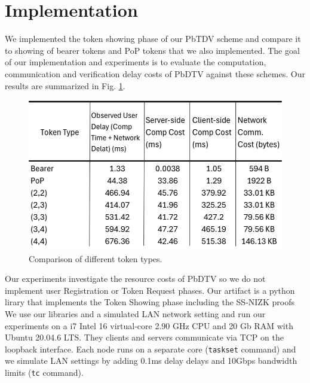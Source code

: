 \documentclass[conference]{IEEEtran}
\begin{document}
\section{Implementation}
\label{sec:Implementation}
We implemented the token showing phase of our PbTDV scheme and compare it to showing of bearer tokens and PoP tokens that we also implemented.
The goal of our implementation and experiments is to evaluate the computation, communication and verification delay costs of PbDTV against these schemes. Our results are summarized in Fig. \ref{experiment-table}.

\begin{figure}
\begin{centering}
\includegraphics[width=.5\textwidth]{Figures/Results.jpeg}
\caption{Comparison of different token types.}
\label{experiment-table}
\end{centering}
\end{figure}

Our experiments investigate the resource costs of PbDTV so we do not implement user Registration or Token Request phases. Our artifact is a python lirary that implements the Token Showing phase including the SS-NIZK proofs %
We use our libraries and a simulated LAN network setting and run our experiments on a i7 Intel  16 virtual-core 2.90 GHz CPU and 20 Gb RAM with Ubuntu 20.04.6 LTS. They clients and servers communicate via TCP on the loopback interface. Each node runs on a separate core (\texttt{taskset} command) and we simulate LAN settings by adding 0.1ms delay delays and 10Gbps bandwidth limits (\texttt{tc} command). %
\end{document}
